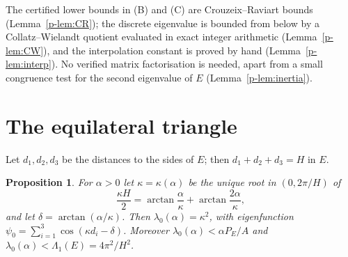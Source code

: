 \documentclass[11pt]{article}
\newtheorem{proposition}[theorem]{Proposition}
\theoremstyle{remark}
\begin{document}
The certified lower bounds in (B) and (C) are Crouzeix--Raviart bounds
(Lemma~\ref{p-lem:CR}); the discrete eigenvalue is bounded from below by a Collatz--Wielandt
quotient evaluated in exact integer arithmetic (Lemma~\ref{p-lem:CW}), and the interpolation
constant is proved by hand (Lemma~\ref{p-lem:interp}). No verified matrix factorisation is needed,
apart from a small congruence test for the second eigenvalue of $E$ (Lemma~\ref{p-lem:inertia}).
\section{The equilateral triangle}\label{p-sec:equi}

Let $d_1,d_2,d_3$ be the distances to the sides of $E$; then $d_1+d_2+d_3=H$ in $E$.

\begin{proposition}\label{p-prop:equi}
For $\alpha>0$ let $\kappa=\kappa(\alpha)$ be the unique root in $(0,2\pi/H)$ of
\begin{equation}\label{p-eq:kappa}
  \frac{\kappa H}{2}=\arctan\frac{\alpha}{\kappa}+\arctan\frac{2\alpha}{\kappa},
\end{equation}
and let $\delta=\arctan(\alpha/\kappa)$. Then $\lambda_0(\alpha)=\kappa^2$, with eigenfunction
$\psi_0=\sum_{i=1}^3\cos(\kappa d_i-\delta)$. Moreover $\lambda_0(\alpha)<\alpha P_E/A$ and
$\lambda_0(\alpha)<\Lambda_1(E)=4\pi^2/H^2$.
\end{proposition}
\end{document}
